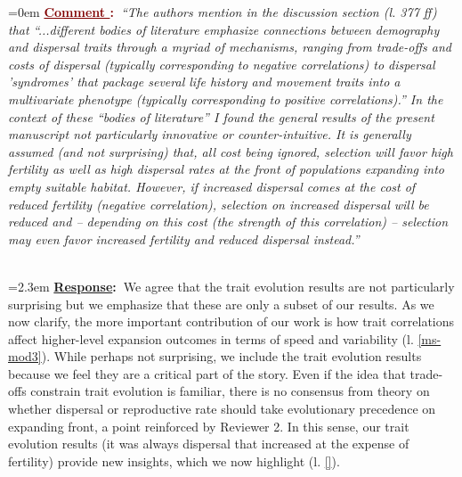 \documentclass[12pt]{article}
\newcounter{cN}
\newcommand{\comment}[1]{
	\vspace{2em}
	\refstepcounter{cN} %
	\noindent \hangindent=0em \textbf{\textcolor{Maroon}{\uline{Comment \thecN}:~}}\emph{``#1''}
	}
\newcommand{\response}[1]{
	\\[0.25em]
	\hangindent=2.3em \textbf{\textcolor{NavyBlue}{\uline{Response}:~}}#1
	}
\begin{document}
\comment{The authors mention in the discussion section (l. 377 ff) that ``...different bodies of literature emphasize connections between demography and dispersal traits through a myriad of mechanisms, ranging from trade-offs and costs of dispersal (typically corresponding to negative correlations) to dispersal 'syndromes' that package several life history and movement traits into a multivariate phenotype (typically corresponding to positive correlations).''
In the context of these ``bodies of literature'' I found the general results of the present manuscript not particularly innovative or counter-intuitive.
It is generally assumed (and not surprising) that, all cost being ignored, selection will favor high fertility as well as high dispersal rates at the front of populations expanding into empty suitable habitat.
However, if increased dispersal comes at the cost of reduced fertility (negative correlation), selection on increased dispersal will be reduced and – depending on this cost (the strength of this correlation) – selection may even favor increased fertility and reduced dispersal instead.}
\response{We agree that the trait evolution results are not particularly surprising but we emphasize that these are only a subset of our results.
As we now clarify, the more important contribution of our work is how trait correlations affect higher-level expansion outcomes in terms of speed and variability (l. \ref{ms-mod3}).
While perhaps not surprising, we include the trait evolution results because we feel they are a critical part of the story.
Even if the idea that trade-offs constrain trait evolution is familiar, there is no consensus from theory on whether dispersal or reproductive rate should take evolutionary precedence on expanding front, a point reinforced by Reviewer 2.
In this sense, our trait evolution results (it was always dispersal that increased at the expense of fertility) provide new insights, which we now highlight (l. \ref{}).}
\end{document}
